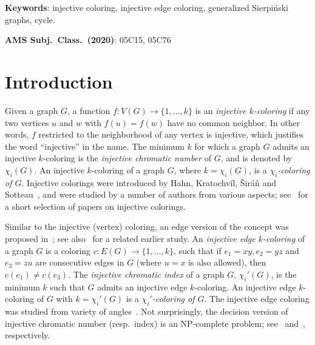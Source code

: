 \documentclass{article}
\begin{document}
\noindent\textbf{Keywords}: injective coloring, injective edge coloring, generalized Sierpi\'{n}ski graphs, cycle. 

\noindent\textbf{AMS Subj.\ Class.\ (2020)}: 05C15, 05C76    

\section{Introduction}

Given a graph $G$, a function $f:V(G)\rightarrow\{1,\dots,k\}$ is an {\em injective $k$-coloring} if
any two vertices $u$ and $w$ with $f(u)=f(w)$ have no common neighbor. 
In other words, $f$ restricted to the neighborhood of any vertex is injective, which justifies the word ``injective'' in the name.
The minimum $k$ for which a graph $G$ admits an injective $k$-coloring is the {\em injective chromatic number} of $G$, and is denoted by $\chi_{i}(G)$. An injective $k$-coloring of a graph $G$, where $k=\chi_i(G)$, is a {\em $\chi_i$-coloring of $G$}. Injective colorings were introduced by Hahn, Kratochv\' il, \v{S}ir\'{a}\v{n} and Sotteau~\cite{hkss}, and were studied by a number of authors from various aspects; see~\cite{BSY, ICGenMycielskain, bu-2009, cky-2010, deng-2021, dl, jin-2013, ls-2015, mo, pp, SSY, sy} for a short selection of papers on injective colorings.

Similar to the injective (vertex) coloring, an edge version of the concept was proposed in~\cite{cardoso2019iec}; see also~\cite{csilla} for a related earlier study. 
 An {\em injective edge $k$-coloring} of a graph $G$ is a coloring $c : E(G) \rightarrow \{1,\dots,k\}$, such that if $e_1=xy, e_2=yz$ and $e_3=zu$ are consecutive edges in $G$ (where $u=x$ is also allowed), then $c(e_1) \neq c(e_3)$. The {\em injective chromatic index} of a graph $G$, $\chi_i'(G)$, is the minimum $k$ such that $G$ admits an injective edge $k$-coloring. An injective edge $k$-coloring of $G$ with $k=\chi_i'(G)$ is a {\em $\chi_i'$-coloring of $G$}.
  The injective edge coloring was studied from variety of angles~\cite{cardoso2019iec, IECBCK, FerdjallahIEC2021, FoucaudIEC2021}. Not surprisingly, the decision version of injective chromatic number (resp.\ index) is an NP-complete problem; see~\cite{hkss} and~\cite{cardoso2019iec}, respectively. 
\end{document}
